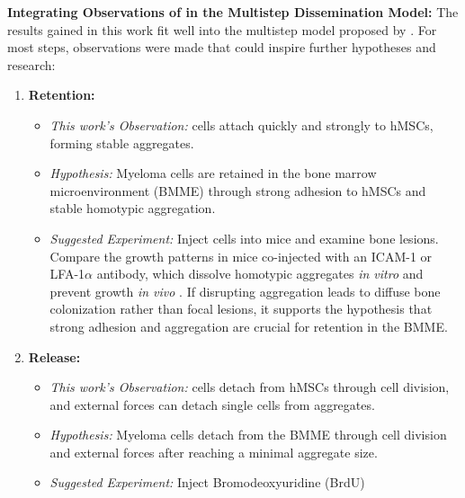 \textbf{Integrating Observations of \INA in the Multistep Dissemination Model:}
The results gained in this work fit well into the multistep model proposed by
\citet{zeissigTumourDisseminationMultiple2020}. For most steps, observations
were made that could inspire further hypotheses and research:


\begin{enumerate}
      \item \textbf{Retention:}
            \begin{itemize}
                  \item \textit{This work's Observation:} \INA cells attach quickly and
                        strongly to \acp{hMSC}, forming stable aggregates.
                  \item \textit{Hypothesis:} Myeloma cells are retained in the
                        bone marrow microenvironment (BMME) through strong adhesion to
                        \acp{hMSC} and stable homotypic aggregation.
                  \item \textit{Suggested Experiment:} Inject \INA cells into mice and
                        examine bone lesions. Compare the growth patterns in mice
                        co-injected with an ICAM-1 or LFA-1$\alpha$ antibody, which
                        dissolve homotypic aggregates \textit{in vitro} and prevent
                        \INA growth \textit{in vivo}
                        \cite{kawanoHomotypicCellAggregations1991a,
                              klauszNovelFcengineeredHuman2017}. If disrupting aggregation
                        leads to diffuse bone colonization rather than focal lesions,
                        it supports the hypothesis that strong adhesion and
                        aggregation are crucial for retention in the \ac{BMME}.
            \end{itemize}
      \item \textbf{Release:}
            \begin{itemize}
                  \item \textit{This work's Observation:} \INA cells detach from \acp{hMSC}
                        through cell division, and external forces can detach single
                        cells from \INA aggregates.
                  \item \textit{Hypothesis:} Myeloma cells detach from the BMME
                        through cell division and external forces after reaching a
                        minimal aggregate size.
                  \item \textit{Suggested Experiment:} Inject Bromodeoxyuridine (BrdU)

\end{itemize}
\end{enumerate}
